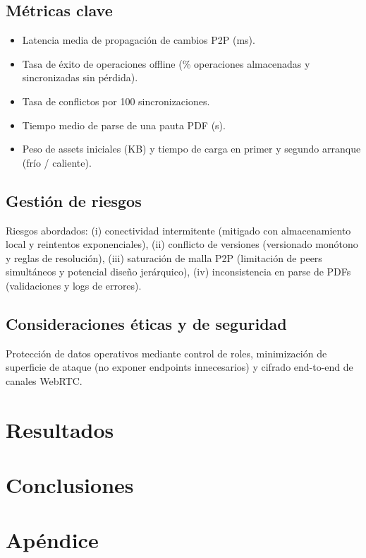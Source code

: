 \documentclass[12pt,a4paper]{report}
\begin{document}
\section*{Métricas clave} \begin{itemize} \item Latencia media de propagación de cambios P2P (ms). \item Tasa de éxito de operaciones offline (\% operaciones almacenadas y sincronizadas sin pérdida). \item Tasa de conflictos por 100 sincronizaciones. \item Tiempo medio de parse de una pauta PDF (s). \item Peso de assets iniciales (KB) y tiempo de carga en primer y segundo arranque (frío / caliente). \end{itemize}

\section*{Gestión de riesgos} Riesgos abordados: (i) conectividad intermitente (mitigado con almacenamiento local y reintentos exponenciales), (ii) conflicto de versiones (versionado monótono y reglas de resolución), (iii) saturación de malla P2P (limitación de peers simultáneos y potencial diseño jerárquico), (iv) inconsistencia en parse de PDFs (validaciones y logs de errores).

\section*{Consideraciones éticas y de seguridad} Protección de datos operativos mediante control de roles, minimización de superficie de ataque (no exponer endpoints innecesarios) y cifrado end-to-end de canales WebRTC.

\chapter*{Resultados}


\chapter*{Conclusiones}


\appendix
\chapter*{Apéndice}
\end{document}

